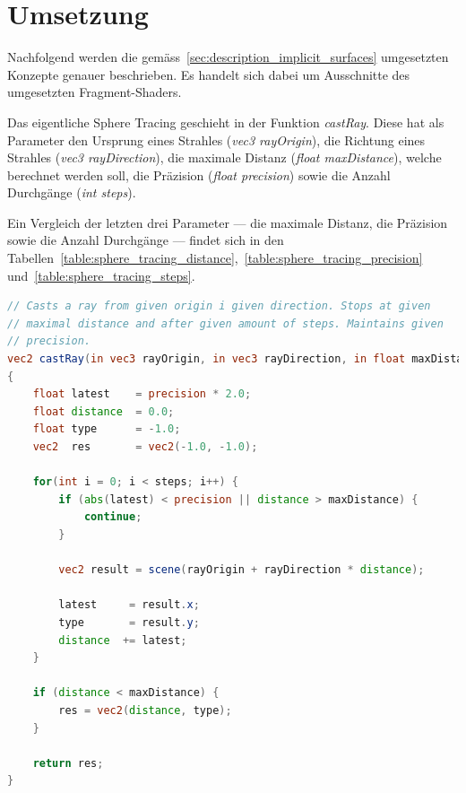 
\section{Umsetzung}
\label{sec:realization}

Nachfolgend werden die
gemäss~\autoref{sec:description_implicit_surfaces} umgesetzten Konzepte
genauer beschrieben. Es handelt sich dabei um Ausschnitte des
umgesetzten Fragment-Shaders.

Das eigentliche Sphere Tracing geschieht in der Funktion
\textit{castRay}.  Diese hat als Parameter den Ursprung eines Strahles
(\textit{vec3 rayOrigin}), die Richtung eines Strahles (\textit{vec3
    rayDirection}), die maximale Distanz (\textit{float maxDistance}),
welche berechnet werden soll, die Präzision (\textit{float precision})
sowie die Anzahl Durchgänge (\textit{int steps}).

Ein Vergleich der letzten drei Parameter --- die maximale Distanz, die
Präzision sowie die Anzahl Durchgänge --- findet sich in den
Tabellen~\ref{table:sphere_tracing_distance},~\ref{table:sphere_tracing_precision}
und~\ref{table:sphere_tracing_steps}.

\begin{lstlisting}[language=GLSL,caption={Umsetzung des Sphere Tracings in
        GLSL.},label={alg:glsl_sphere_tracing},captionpos=b,emph={castRay}]
// Casts a ray from given origin i given direction. Stops at given
// maximal distance and after given amount of steps. Maintains given
// precision.
vec2 castRay(in vec3 rayOrigin, in vec3 rayDirection, in float maxDistance, in float precision, in int steps)
{
    float latest    = precision * 2.0;
    float distance  = 0.0;
    float type      = -1.0;
    vec2  res       = vec2(-1.0, -1.0);

    for(int i = 0; i < steps; i++) {
        if (abs(latest) < precision || distance > maxDistance) {
            continue;
        }

        vec2 result = scene(rayOrigin + rayDirection * distance);

        latest     = result.x;
        type       = result.y;
        distance  += latest;
    }

    if (distance < maxDistance) {
        res = vec2(distance, type);
    }

    return res;
}
\end{lstlisting}


